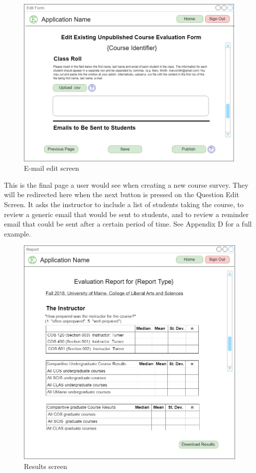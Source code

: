 \documentclass{article}
\begin{document}
\begin{center}
\begin{figure}[H]
    \centering
    \caption{E-mail edit screen}
    \includegraphics[scale=.30]{images/emails_screen.png}
\end{figure}
\end{center}

This is the final page a user would see when creating a new course survey. They will be redirected here when the next button is pressed on the Question Edit Screen. It asks the instructor to include a list of students taking the course, to review a generic email that would be sent to students, and to review a reminder email that could be sent after a certain period of time. See Appendix D for a full example.

\begin{center}
\begin{figure}[H]
    \centering
    \caption{Results screen}
    \includegraphics[scale=.25]{images/report_screen.png}
\end{figure}
\end{center}
\end{document}
